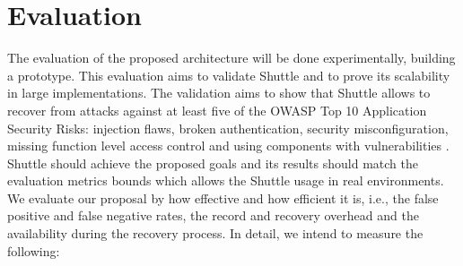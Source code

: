 \section{Evaluation}
\label{sec:Evaluation}

The evaluation of the proposed architecture will be done experimentally, building a prototype. This evaluation aims to validate Shuttle and to prove its scalability in large implementations. The validation aims to show that Shuttle allows to recover from attacks against at least five of the OWASP Top 10 Application Security Risks: injection flaws, broken authentication, security misconfiguration, missing function level access control and using components with vulnerabilities \cite{Williams2013}. Shuttle should achieve the proposed goals and its results should match the evaluation metrics bounds which allows the Shuttle usage in real environments. We evaluate our proposal by how effective and how efficient it is, i.e., the false positive and false negative rates, the record and recovery overhead and the availability during the recovery process. In detail, we intend to measure the following:

